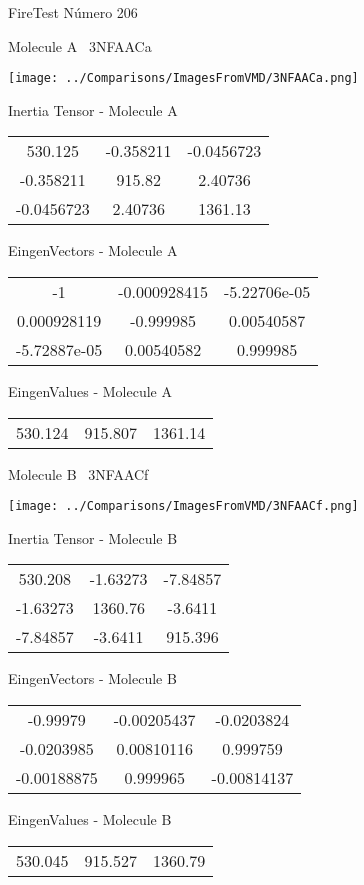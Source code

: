 \vtab[-3cm]
\begin{center}
{\large FireTest \tab Número 206}
\end{center}
\begin{multicols}{2}
\begin{center}

Molecule A \
3NFAACa

\texttt{[image: ../Comparisons/ImagesFromVMD/3NFAACa.png]}

Inertia Tensor - Molecule A \\
\begin{tabular}{|c c c|}
530.125	 & 	-0.358211	 & 	-0.0456723	 \\
-0.358211	 & 	915.82	 & 	2.40736	 \\
-0.0456723	 & 	2.40736	 & 	1361.13
\end{tabular}

\vtab
 EingenVectors - Molecule A     \\
\begin{tabular}{|c c c|}
-1	 & 	-0.000928415	 & 	-5.22706e-05	 \\
0.000928119	 & 	-0.999985	 & 	0.00540587	 \\
-5.72887e-05	 & 	0.00540582	 & 	0.999985
\end{tabular}

\vtab
 EingenValues - Molecule A     \\
\begin{tabular}{|c c c|}
530.124	 & 	915.807	 & 	1361.14	 \\
\end{tabular}
\columnbreak

Molecule B \
3NFAACf

\texttt{[image: ../Comparisons/ImagesFromVMD/3NFAACf.png]}

Inertia Tensor - Molecule B \\
\begin{tabular}{|c c c|}
530.208	 & 	-1.63273	 & 	-7.84857	 \\
-1.63273	 & 	1360.76	 & 	-3.6411	 \\
-7.84857	 & 	-3.6411	 & 	915.396
\end{tabular}

\vtab
 EingenVectors - Molecule B     \\
\begin{tabular}{|c c c|}
-0.99979	 & 	-0.00205437	 & 	-0.0203824	 \\
-0.0203985	 & 	0.00810116	 & 	0.999759	 \\
-0.00188875	 & 	0.999965	 & 	-0.00814137
\end{tabular}

\vtab
 EingenValues - Molecule B     \\
\begin{tabular}{|c c c|}
530.045	 & 	915.527	 & 	1360.79	 \\
\end{tabular}

\end{center}
\end{multicols}

